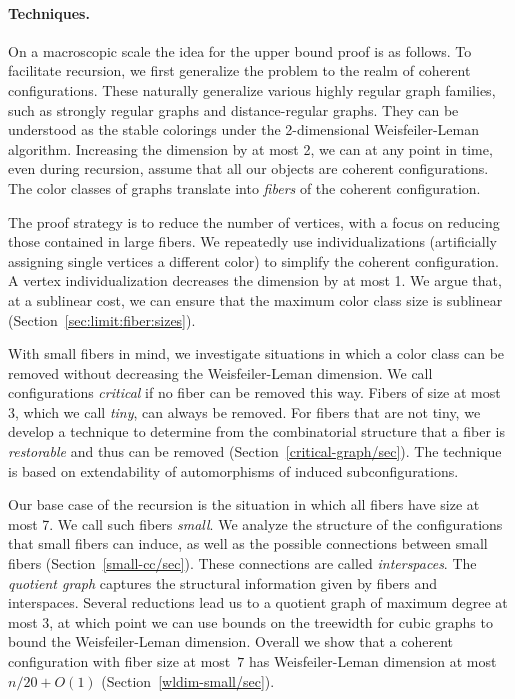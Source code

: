\documentclass[english,a4paper]{article}
\theoremstyle{plain}
\theoremstyle{definition}
\begin{document}
\paragraph{Techniques.} On a macroscopic scale the idea for the upper bound proof is as follows. To facilitate recursion, we first generalize the problem to the realm of coherent configurations. These naturally generalize various highly regular graph families, such as strongly regular graphs and distance-regular graphs. They can be understood as the stable colorings under the 2-dimensional Weisfeiler-Leman algorithm.
Increasing the dimension by at most 2, we can at any point in time, even during recursion, assume that all our objects are coherent configurations. The color classes of graphs translate into \emph{fibers} of the coherent configuration.

The proof strategy is to reduce the number of vertices, with a focus on reducing those contained in large fibers. We repeatedly use individualizations (artificially assigning single vertices a different color) to simplify the coherent configuration. A vertex individualization decreases the dimension by at most 1.
We argue that, at a sublinear cost, we can ensure that the maximum color class size is sublinear (Section~\ref{sec:limit:fiber:sizes}).

With small fibers in mind, we investigate situations in which a color class can be removed without decreasing the Weisfeiler-Leman dimension. We call configurations \emph{critical} if no fiber can be removed this way. Fibers of size at most~$3$, which we call \emph{tiny}, can always be removed.
For fibers that are not tiny, we develop a technique to determine from the combinatorial structure that a fiber is \emph{restorable} and thus can be removed (Section~\ref{critical-graph/sec}). The technique is based on extendability of automorphisms of induced subconfigurations.

Our base case of the recursion is the situation in which all fibers have size at most 7. We call such fibers \emph{small}. We analyze the structure of the configurations that small fibers can induce, as well as the possible connections between small fibers (Section~\ref{small-cc/sec}). These connections are called \emph{interspaces}. The \emph{quotient graph} captures the structural information given by fibers and interspaces. Several reductions lead us to a quotient graph of maximum degree at most 3, at which point we can use bounds on the treewidth for cubic graphs to bound the Weisfeiler-Leman dimension.
Overall we show that a coherent configuration with fiber size at most~$7$ has Weisfeiler-Leman dimension at most~$n/20 + O(1)$ (Section~\ref{wldim-small/sec}).
\end{document}
